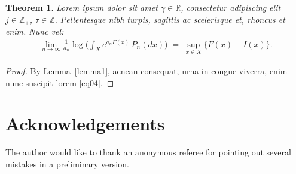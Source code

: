 \documentclass[reqno,final,11pt]{amsart}
\theoremstyle{plain}
\newtheorem{theorem}{Theorem}[section]
\theoremstyle{definition}
\theoremstyle{remark}
\newcommand{\N}{\mathbb{Z}_{+}}
\newcommand{\Z}{\mathbb{Z}}
\newcommand{\R}{\mathbb{R}}
\begin{document}
\begin{theorem}\label{thm1}
 Lorem ipsum dolor sit amet $\gamma \in \R$, consectetur adipiscing elit $j\in\N$, $\tau\in\Z$. Pellentesque nibh turpis, sagittis ac scelerisque et, rhoncus et enim. Nunc vel:
\begin{align}\label{eq04}
\lim_{n\to\infty} \frac{1}{a_n}\log \Big(\int_X e^{a_nF(x)}\,P_n(dx)\Big)\;=\;\sup_{x\in X}\Big\{ F(x)-I(x)\Big\}.
\end{align}
\end{theorem}
\begin{proof}
By Lemma~\ref{lemma1},  aenean consequat, urna in congue viverra, enim nunc suscipit lorem \eqref{eq04}.
\end{proof}

\section*{Acknowledgements}
The author would like to thank an anonymous referee for
pointing out several mistakes in a preliminary version.



\end{document}

